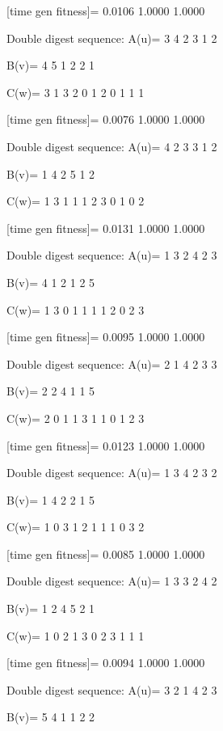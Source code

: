 [time gen fitness]=
    0.0106    1.0000    1.0000

Double digest sequence:
A(u)=
     3     4     2     3     1     2

B(v)=
     4     5     1     2     2     1

C(w)=
     3     1     3     2     0     1     2     0     1     1     1

[time gen fitness]=
    0.0076    1.0000    1.0000

Double digest sequence:
A(u)=
     4     2     3     3     1     2

B(v)=
     1     4     2     5     1     2

C(w)=
     1     3     1     1     1     2     3     0     1     0     2

[time gen fitness]=
    0.0131    1.0000    1.0000

Double digest sequence:
A(u)=
     1     3     2     4     2     3

B(v)=
     4     1     2     1     2     5

C(w)=
     1     3     0     1     1     1     1     2     0     2     3

[time gen fitness]=
    0.0095    1.0000    1.0000

Double digest sequence:
A(u)=
     2     1     4     2     3     3

B(v)=
     2     2     4     1     1     5

C(w)=
     2     0     1     1     3     1     1     0     1     2     3

[time gen fitness]=
    0.0123    1.0000    1.0000

Double digest sequence:
A(u)=
     1     3     4     2     3     2

B(v)=
     1     4     2     2     1     5

C(w)=
     1     0     3     1     2     1     1     1     0     3     2

[time gen fitness]=
    0.0085    1.0000    1.0000

Double digest sequence:
A(u)=
     1     3     3     2     4     2

B(v)=
     1     2     4     5     2     1

C(w)=
     1     0     2     1     3     0     2     3     1     1     1

[time gen fitness]=
    0.0094    1.0000    1.0000

Double digest sequence:
A(u)=
     3     2     1     4     2     3

B(v)=
     5     4     1     1     2     2

